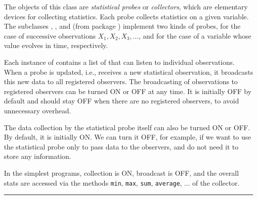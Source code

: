 
The objects of this class are \emph{statistical probes} or
\emph{collectors}, which are elementary devices for collecting
statistics. Each probe collects statistics on a given variable.
The subclasses , , and
 (from package
)
implement two kinds of probes, for the case of successive observations
$X_1,X_2,X_3,\dots$, and for the case of a variable whose value
evolves in time, respectively.

Each instance of
 contains a list of  that can listen
to individual observations.
When a probe is updated, i.e., receives a new statistical observation,
it broadcasts this new data to all registered observers.
The broadcasting of observations to registered observers can be turned
ON or OFF at any time.
It is initially OFF by default and should stay OFF when there are
no registered observers, to avoid unnecessary overhead.

The data collection by the statistical probe itself can also be turned
ON or OFF.  By default, it is initially ON.
We can turn it OFF, for example, if we want to use the statistical probe
only to pass data to the observers, and do not need it to store
any information.

In the simplest programs, collection is ON, broadcast is OFF, and the overall
stats are accessed via the methods
\texttt{min}, \texttt{max}, \texttt{sum}, \texttt{average}, ... of the
collector.

\bigskip\hrule

